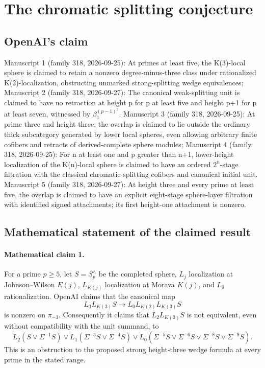 \documentclass[11pt]{article}
\begin{document}
\section*{The chromatic splitting conjecture}

\subsection{OpenAI's claim}
Manuscript 1 (family 318, 2026-09-25): At primes at least five, the K(3)-local sphere is claimed to retain a nonzero degree-minus-three class under rationalized K(2)-localization, obstructing unmarked strong-splitting wedge equivalences; Manuscript 2 (family 318, 2026-09-27): The canonical weak-splitting unit is claimed to have no retraction at height p for p at least five and height p+1 for p at least seven, witnessed by \(\beta_1^{(p-1)^2}\). Manuscript 3 (family 318, 2026-09-25): At prime three and height three, the overlap is claimed to lie outside the ordinary thick subcategory generated by lower local spheres, even allowing arbitrary finite cofibers and retracts of derived-complete sphere modules; Manuscript 4 (family 318, 2026-09-25): For n at least one and p greater than n+1, lower-height localization of the K(n)-local sphere is claimed to have an ordered \(2^n\)-stage filtration with the classical chromatic-splitting cofibers and canonical initial unit. Manuscript 5 (family 318, 2026-09-27): At height three and every prime at least five, the overlap is claimed to have an explicit eight-stage sphere-layer filtration with identified signed attachments; its first height-one attachment is nonzero.

\subsection{Mathematical statement of the claimed result}
\paragraph{Mathematical claim 1.} For a prime $p\ge5$, let $S=S_p^\wedge$ be the completed sphere, $L_j$ localization at Johnson--Wilson $E(j)$, $L_{K(j)}$ localization at Morava $K(j)$, and $L_0$ rationalization. OpenAI claims that the canonical map
\[
L_0L_{K(3)}S\longrightarrow L_0L_{K(2)}L_{K(3)}S
\]
is nonzero on $\pi_{-3}$. Consequently it claims that $L_2L_{K(3)}S$ is not equivalent, even without compatibility with the unit summand, to
\[
L_2(S\vee\Sigma^{-1}S)\vee L_1(\Sigma^{-3}S\vee\Sigma^{-4}S)
\vee L_0(\Sigma^{-5}S\vee\Sigma^{-6}S\vee\Sigma^{-8}S\vee\Sigma^{-9}S).
\]
This is an obstruction to the proposed strong height-three wedge formula at every prime in the stated range.
\end{document}
